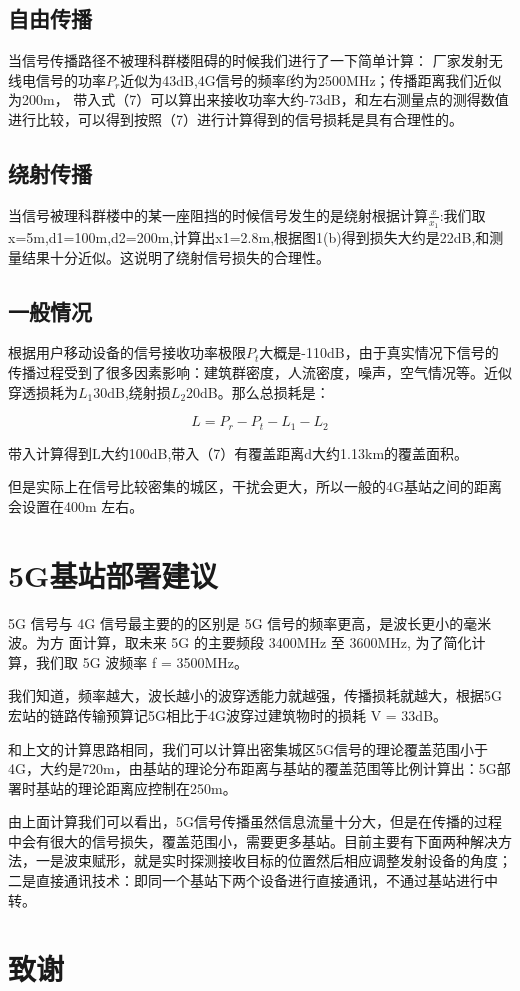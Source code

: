 \documentclass{article}
\begin{document}
\subsection{自由传播}
当信号传播路径不被理科群楼阻碍的时候我们进行了一下简单计算：
厂家发射无线电信号的功率$P_r$近似为43dB,4G信号的频率f约为2500MHz；传播距离我们近似为200m，
带入式（7）可以算出来接收功率大约-73dB，和左右测量点的测得数值进行比较，可以得到按照（7）进行计算得到的信号损耗是具有合理性的。

\subsection{绕射传播}
当信号被理科群楼中的某一座阻挡的时候信号发生的是绕射根据计算$\frac{x}{x_1}$:我们取x=5m,d1=100m,d2=200m,计算出x1=2.8m,根据图1(b)得到损失大约是22dB,和测量结果十分近似。这说明了绕射信号损失的合理性。

\subsection{一般情况}
 根据用户移动设备的信号接收功率极限$P_t$大概是-110dB，由于真实情况下信号的传播过程受到了很多因素影响：建筑群密度，人流密度，噪声，空气情况等。近似穿透损耗为$L_1$30dB,绕射损$L_2$20dB。那么总损耗是：
 
 \begin{equation}
     L = P_r - P_t - L_1 - L_2
 \end{equation}
 
 带入计算得到L大约100dB,带入（7）有覆盖距离d大约1.13km的覆盖面积。
 
 但是实际上在信号比较密集的城区，干扰会更大，所以一般的4G基站之间的距离会设置在400m
 左右。


\section{5G基站部署建议}
     5G 信号与 4G 信号最主要的的区别是 5G 信号的频率更高，是波长更小的毫米波。为方
面计算，取未来 5G 的主要频段 3400MHz 至 3600MHz, 为了简化计算，我们取 5G 波频率
f = 3500MHz。

   我们知道，频率越大，波长越小的波穿透能力就越强，传播损耗就越大，根据5G宏站的链路传输预算记5G相比于4G波穿过建筑物时的损耗 V = 33dB。
   
   和上文的计算思路相同，我们可以计算出密集城区5G信号的理论覆盖范围小于4G，大约是720m，由基站的理论分布距离与基站的覆盖范围等比例计算出：5G部署时基站的理论距离应控制在250m。
   
   由上面计算我们可以看出，5G信号传播虽然信息流量十分大，但是在传播的过程中会有很大的信号损失，覆盖范围小，需要更多基站。目前主要有下面两种解决方法，一是波束赋形，就是实时探测接收目标的位置然后相应调整发射设备的角度；二是直接通讯技术：即同一个基站下两个设备进行直接通讯，不通过基站进行中转。
   




\section{致谢}
\end{document}
